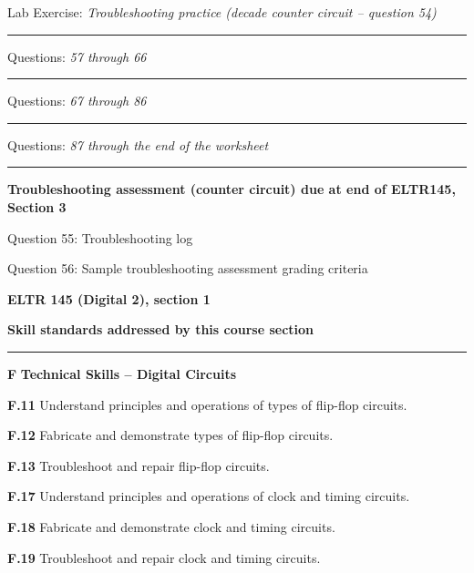 \hskip 10pt Lab Exercise: {\it Troubleshooting practice (decade counter circuit -- question 54)}
 
\vskip 10pt
\hrule \vskip 5pt
\noindent
{}

\hskip 10pt Questions: {\it 57 through 66}
 
\vskip 10pt
\hrule \vskip 5pt
\noindent
{}

\hskip 10pt Questions: {\it 67 through 86}
 
\vskip 10pt
\hrule \vskip 5pt
\noindent
{}

\hskip 10pt Questions: {\it 87 through the end of the worksheet}
 
\vskip 10pt
\hrule \vskip 5pt
\noindent
{}

\hskip 10pt {\bf Troubleshooting assessment (counter circuit) due at end of ELTR145, Section 3}

\hskip 10pt Question 55: Troubleshooting log
 
\hskip 10pt Question 56: Sample troubleshooting assessment grading criteria
 
\vskip 10pt








\vfil \eject

\centerline{\bf ELTR 145 (Digital 2), section 1} \bigskip 
 
\vskip 10pt

\noindent
{\bf Skill standards addressed by this course section}

\vskip 5pt

\hrule \vskip 10pt
\noindent
{}

\vskip 5pt

\medskip
\item{\bf F} {\bf Technical Skills -- Digital Circuits}
\item{\bf F.11} Understand principles and operations of types of flip-flop circuits.
\item{\bf F.12} Fabricate and demonstrate types of flip-flop circuits.
\item{\bf F.13} Troubleshoot and repair flip-flop circuits.
\item{\bf F.17} Understand principles and operations of clock and timing circuits.
\item{\bf F.18} Fabricate and demonstrate clock and timing circuits.
\item{\bf F.19} Troubleshoot and repair clock and timing circuits.
\medskip

